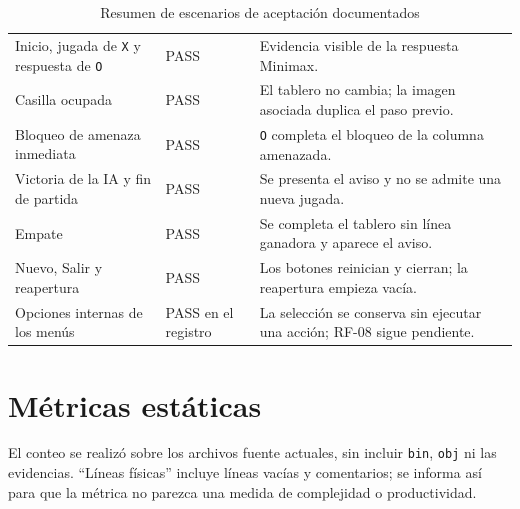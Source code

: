 \begin{table}[H]
\centering
\caption{Resumen de escenarios de aceptación documentados}
\label{tab:tests}
\begin{tabular}{P{4.0cm}P{2.0cm}P{8.5cm}}
\toprule
{} &  & \\
\midrule
Inicio, jugada de \texttt{X} y respuesta de \texttt{O} & PASS & Evidencia visible de la respuesta Minimax.\\
Casilla ocupada & PASS & El tablero no cambia; la imagen asociada duplica el paso previo.\\
Bloqueo de amenaza inmediata & PASS & \texttt{O} completa el bloqueo de la columna amenazada.\\
Victoria de la IA y fin de partida & PASS & Se presenta el aviso y no se admite una nueva jugada.\\
Empate & PASS & Se completa el tablero sin línea ganadora y aparece el aviso.\\
Nuevo, Salir y reapertura & PASS & Los botones reinician y cierran; la reapertura empieza vacía.\\
Opciones internas de los menús & PASS en el registro & La selección se conserva sin ejecutar una acción; RF-08 sigue pendiente.\\
\bottomrule
\end{tabular}
\end{table}

\section{Métricas estáticas}
El conteo se realizó sobre los archivos fuente actuales, sin incluir \texttt{bin}, \texttt{obj} ni las evidencias. “Líneas físicas” incluye líneas vacías y comentarios; se informa así para que la métrica no parezca una medida de complejidad o productividad.

